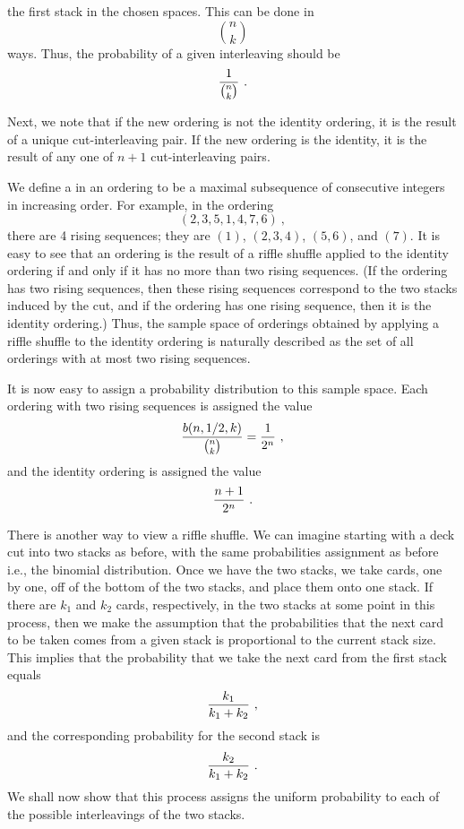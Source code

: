the first stack in the chosen spaces.  This can be done in 
$${{n}\choose{k}}$$ ways.  Thus, the probability of a given interleaving should be
$${1\over{{n}\choose{k}}}\ .$$
\par Next, we note that if the new ordering is not the identity ordering, it is the
result of a unique cut-interleaving pair.  If the new ordering is the identity, it is
the result of any one of $n+1$ cut-interleaving pairs.  
\par  We define a  in an ordering to be a maximal
subsequence of consecutive integers in increasing order.  For example, in the ordering
$$(2, 3, 5, 1, 4, 7, 6)\ ,$$
there are 4 rising sequences; they are $(1)$, $(2, 3, 4)$,
$(5, 6)$, and $(7)$.  It is easy to see that an ordering is the result of a riffle
shuffle applied to the identity ordering if and only if it has no more than two rising
sequences.  (If the ordering has two rising sequences, then these rising sequences
correspond to the two stacks induced by the cut, and if the ordering has one rising
sequence, then it is the identity ordering.)  Thus, the sample space of orderings
obtained by applying a riffle shuffle to the identity ordering is naturally described
as the set of all orderings with at most two rising sequences.  
\par It is now easy to assign a probability distribution to this sample space.  Each
ordering with two rising sequences is assigned the value 
$${{b(n, 1/2, k)}\over{{{n}\choose{k}}}} = {1\over{2^n}}\ ,$$ and the identity
ordering is assigned the value
$${{n+1}\over{2^n}}\ .$$
\par There is another way to view a riffle shuffle.  We can imagine starting with a
deck cut into two stacks as before, with the same probabilities assignment as before
i.e., the binomial distribution.  Once we have the two stacks, we take cards, one by
one, off of the bottom of the two stacks, and place them onto one stack.  If there are
$k_1$ and $k_2$ cards, respectively, in the two stacks at some point in this process,
then we make the assumption that the probabilities that the next card to be taken comes
from a given stack is proportional to the current stack size.  This implies that the 
probability that we take the next card from the first stack equals
$${{k_1}\over{k_1 + k_2}}\ ,$$
and the corresponding probability for the second stack is
$${{k_2}\over{k_1 + k_2}}\ .$$
We shall now show that this process assigns the uniform probability to each of the possible
interleavings of the two stacks.
\par 
